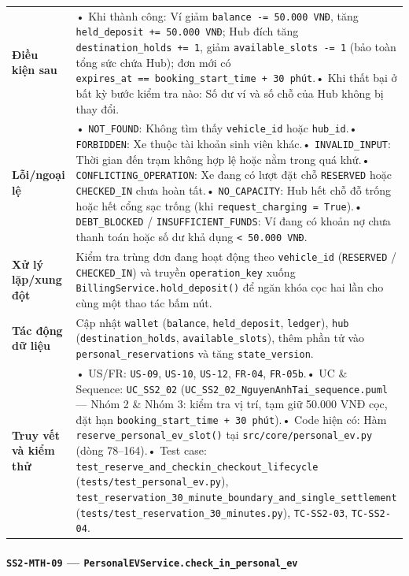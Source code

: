 \documentclass[11pt,a4paper]{article}
\begin{document}
\begin{longtable}[]{@{}
  >{\raggedright\arraybackslash}p{}
  >{\raggedright\arraybackslash}p{}@{}}
\textbf{Điều kiện sau} & • Khi thành công: Ví giảm
\texttt{balance\ -=\ 50.000\ VNĐ}, tăng
\texttt{held\_deposit\ +=\ 50.000\ VNĐ}; Hub đích tăng
\texttt{destination\_holds\ +=\ 1}, giảm
\texttt{available\_slots\ -=\ 1} (bảo toàn tổng sức chứa Hub); đơn mới
có \texttt{expires\_at\ ==\ booking\_start\_time\ +\ 30\ phút}.• Khi
thất bại ở bất kỳ bước kiểm tra nào: Số dư ví và số chỗ của Hub không bị
thay đổi. \\
\textbf{Lỗi/ngoại lệ} & • \texttt{NOT\_FOUND}: Không tìm thấy
\texttt{vehicle\_id} hoặc \texttt{hub\_id}.• \texttt{FORBIDDEN}: Xe
thuộc tài khoản sinh viên khác.• \texttt{INVALID\_INPUT}: Thời gian đến
trạm không hợp lệ hoặc nằm trong quá khứ.•
\texttt{CONFLICTING\_OPERATION}: Xe đang có lượt đặt chỗ
\texttt{RESERVED} hoặc \texttt{CHECKED\_IN} chưa hoàn tất.•
\texttt{NO\_CAPACITY}: Hub hết chỗ đỗ trống hoặc hết cổng sạc trống (khi
\texttt{request\_charging\ =\ True}).• \texttt{DEBT\_BLOCKED} /
\texttt{INSUFFICIENT\_FUNDS}: Ví đang có khoản nợ chưa thanh toán hoặc
số dư khả dụng \texttt{\textless{}\ 50.000\ VNĐ}. \\
\textbf{Xử lý lặp/xung đột} & Kiểm tra trùng đơn đang hoạt động theo
\texttt{vehicle\_id} (\texttt{RESERVED} / \texttt{CHECKED\_IN}) và
truyền \texttt{operation\_key} xuống
\texttt{BillingService.hold\_deposit()} để ngăn khóa cọc hai lần cho
cùng một thao tác bấm nút. \\
\textbf{Tác động dữ liệu} & Cập nhật \texttt{wallet} (\texttt{balance},
\texttt{held\_deposit}, \texttt{ledger}), \texttt{hub}
(\texttt{destination\_holds}, \texttt{available\_slots}), thêm phần tử
vào \texttt{personal\_reservations} và tăng \texttt{state\_version}. \\
\textbf{Truy vết và kiểm thử} & • US/FR: \texttt{US-09}, \texttt{US-10},
\texttt{US-12}, \texttt{FR-04}, \texttt{FR-05b}.• UC \& Sequence:
\texttt{UC\_SS2\_02} (\texttt{UC\_SS2\_02\_NguyenAnhTai\_sequence.puml}
--- Nhóm 2 \& Nhóm 3: kiểm tra vị trí, tạm giữ 50.000 VNĐ cọc, đặt hạn
\texttt{booking\_start\_time\ +\ 30\ phút}).• Code hiện có: Hàm
\texttt{reserve\_personal\_ev\_slot()} tại
\texttt{src/core/personal\_ev.py} (dòng 78--164).• Test case:
\texttt{test\_reserve\_and\_checkin\_checkout\_lifecycle}
(\texttt{tests/test\_personal\_ev.py}),
\texttt{test\_reservation\_30\_minute\_boundary\_and\_single\_settlement}
(\texttt{tests/test\_reservation\_30\_minutes.py}), \texttt{TC-SS2-03},
\texttt{TC-SS2-04}. \\
\end{longtable}

\hypertarget{ss2-mth-09-personalevservice.check_in_personal_ev}{%
\paragraph{\texorpdfstring{\texttt{SS2-MTH-09} ---
\texttt{PersonalEVService.check\_in\_personal\_ev}}{SS2-MTH-09 --- PersonalEVService.check\_in\_personal\_ev}}\label{ss2-mth-09-personalevservice.check_in_personal_ev}}
\end{document}
